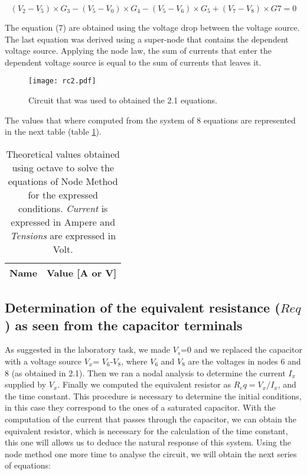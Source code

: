 \begin {equation}
(V_2 - V_5)\times G_3 - (V_5 - V_0)\times G_4 - (V_5 - V_6)\times G_5 + (V_7 - V_8)\times G7 = 0
\end{equation}


The equation (7) are obtained using the voltage drop between the voltage source. The last equation was derived using a super-node that contains the dependent voltage source. Applying the node law, the sum of currents that enter the dependent voltage source is equal to the sum of currents that leaves it. 

\begin{figure}[h] \centering
\texttt{[image: rc2.pdf]}
\caption{Circuit that was used to obtained the 2.1 equations.}
\label{fig:rc2}
\end{figure}


The values that where computed from the system of 8 equations are represented in the next table (table \ref{tab:NM}).

\begin{table}[h]
  \centering
  \begin{tabular}{|l|r|}
    \hline    
    {\bf Name} & {\bf Value [A or V]} \\ \hline
    
  \end{tabular}
  \caption{Theoretical values obtained using octave to solve the equations of Node Method for the expressed conditions. {\em Current}
    is expressed in Ampere and {\it Tensions} are expressed in
    Volt.}
  \label{tab:NM}
\end{table}

\subsection{Determination of the equivalent resistance ($Req$) as seen from the capacitor terminals}

As suggested in the laboratory task, we made $V_s$=0 and we replaced the capacitor with a voltage source $V_x$= $V_6$-$V_8$, where $V_6$ and $V_8$ are the voltages in nodes 6 and 8 (as obtained in 2.1). Then we ran a nodal analysis to determine the current $I_x$ supplied by $V_x$. Finally we computed the equivalent resistor as $R_eq = V_x/I_x$, and the time constant.
This procedure is necessary to determine the initial conditions, in this case they correspond to the ones of a saturated capacitor. With the computation of the current that passes through the capacitor, we can obtain the equivalent resistor, which is necessary for the calculation of the time constant, this one will allows us to deduce the natural response of this system. 
Using the node method one more time to analyse the circuit, we will obtain the next series of equations:

